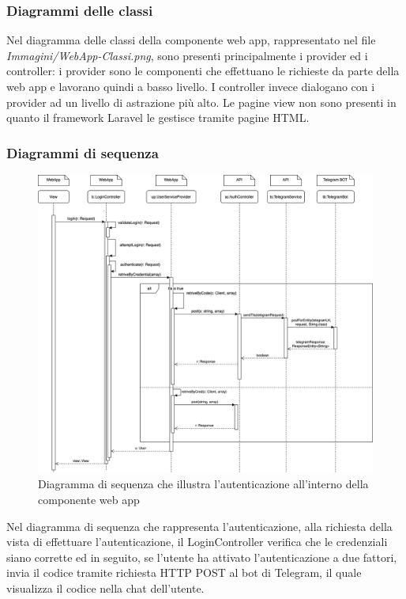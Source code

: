 	\subsubsection{Diagrammi delle classi}%
	Nel diagramma delle classi della componente web app, rappresentato nel file \textit{Immagini/WebApp-Classi.png}, sono presenti principalmente i provider ed i controller: i provider sono le componenti che effettuano le richieste  da parte della web app e lavorano quindi a basso livello.
	\newline
	I controller invece dialogano con i provider ad un livello di astrazione più alto. Le pagine view non sono presenti in quanto il framework Laravel le gestisce tramite pagine HTML.
	\begin{landscape}
	\subsubsection{Diagrammi di sequenza}%
		\begin{figure}[H]
			\centering
			\includegraphics[scale=0.400]{res/images/WEBAPP/AutenticazioneTfa.png}
			\caption{Diagramma di sequenza che illustra l'autenticazione all'interno della componente web app}
			\label{Diagramma 23}
		\end{figure}
		Nel diagramma di sequenza che rappresenta l'autenticazione, alla richiesta della vista di effettuare l'autenticazione, il LoginController verifica che le credenziali siano corrette ed in seguito, se l'utente ha attivato l'autenticazione a due fattori, invia il codice tramite richiesta HTTP POST al bot di Telegram, il quale visualizza il codice nella chat dell'utente.

\end{landscape}
